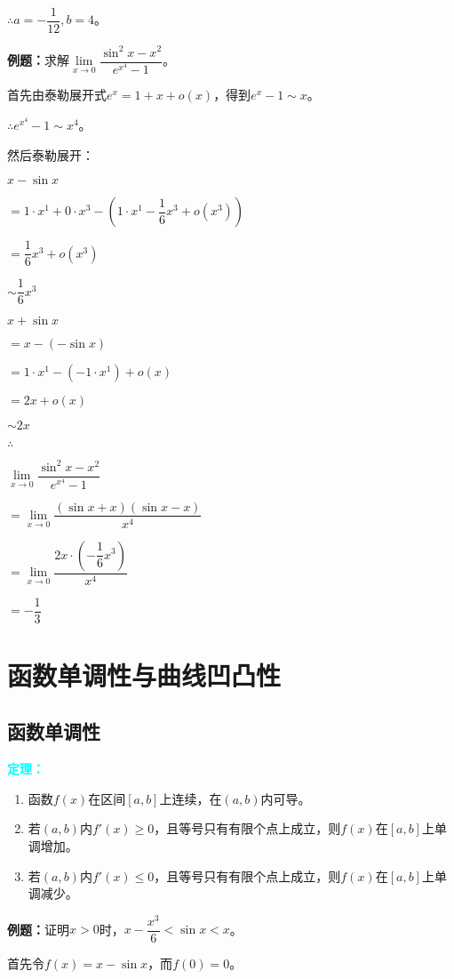\documentclass[UTF8, 12pt]{ctexart}
\begin{document}
$\therefore a=-\dfrac{1}{12},b=4$。

\textbf{例题：}求解$\lim\limits_{x\to 0}\dfrac{\sin^2x-x^2}{e^{x^4}-1}$。

首先由泰勒展开式$e^x=1+x+o(x)$，得到$e^x-1\sim x$。

$\therefore e^{x^4}-1\sim x^4$。

然后泰勒展开：

$x-\sin x$

$= 1\cdot x^1+0\cdot x^3 - (1\cdot x^1-\dfrac{1}{6}x^3+o(x^3))$

$= \dfrac{1}{6}x^3+o(x^3)$

$\sim \dfrac{1}{6}x^3$

$x+\sin x$

$=x-(-\sin x)$

$=1\cdot x^1-(-1\cdot x^1)+o(x)$

$=2x+o(x)$

$\sim 2x$

$\therefore$

$\lim\limits_{x\to 0}\dfrac{\sin^2x-x^2}{e^{x^4}-1}$\medskip

$=\lim\limits_{x\to 0}\dfrac{(\sin x+x)(\sin x-x)}{x^4}$\medskip

$=\lim\limits_{x\to 0}\dfrac{2x\cdot\left(-\dfrac{1}{6}x^3\right)}{x^4}$\medskip

$=-\dfrac{1}{3}$

\section{函数单调性与曲线凹凸性}

\subsection{函数单调性}

\textcolor{aqua}{\textbf{定理：}}

\begin{enumerate}
    \item 函数$f(x)$在区间$[a,b]$上连续，在$(a,b)$内可导。
    \item 若$(a,b)$内$f'(x)\geqslant 0$，且等号只有有限个点上成立，则$f(x)$在$[a,b]$上单调增加。
    \item 若$(a,b)$内$f'(x)\leqslant 0$，且等号只有有限个点上成立，则$f(x)$在$[a,b]$上单调减少。
\end{enumerate}

\textbf{例题：}证明$x>0$时，$x-\dfrac{x^3}{6}<\sin x<x$。

首先令$f(x)=x-\sin x$，而$f(0)=0$。
\end{document}
